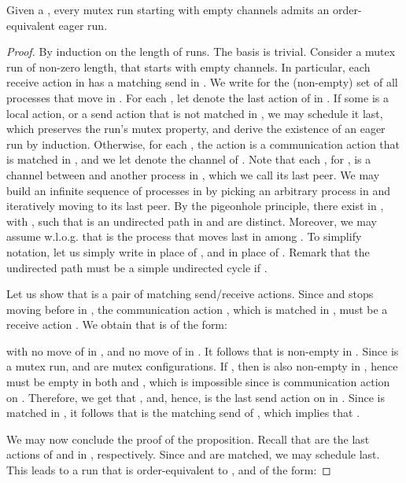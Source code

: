 \documentclass{LMCS}
\newenvironment{proposition}{\begin{prop}}{\end{prop}}
\begin{document}
\begin{proposition}
  \label{p:one-bound}
  Given a \qcp , every mutex run starting with empty channels
  admits an order-equivalent eager run.
\end{proposition}
\begin{proof}
  By induction on the length of runs.
  The basis is trivial.
  Consider a mutex run  of non-zero length, that starts with
  empty channels. In particular, each receive action in
   has a matching send in .
  We write  for the (non-empty) set of all processes
   that move in .
  For each , let  denote the last action of  in
  .
  If some  is a local action, or a send action that is not matched in
  , we may schedule it last, which preserves the run's mutex property,
  and derive the existence of an eager run  by induction.
  Otherwise, for each , the action  is a communication
  action that is matched in , and we let  denote the channel of
  .
  Note that each , for , is a channel between  and
  another process in , which we call its last peer.
  We may build an infinite sequence of processes in  by picking an
  arbitrary process in  and iteratively moving to its last peer.
  By the pigeonhole principle, there exist  in ,
  with , such that  is
  an undirected path in  and  are distinct.
  Moreover, we may assume w.l.o.g. that  is the process that moves
  last in  among .
  To simplify notation, let us simply write  in place of ,
  and  in place of .
Remark that the undirected path  must
  be a simple undirected cycle if .

  Let us show that  is a pair of matching send/receive actions.
  Since  and  stops moving before  in
  , the communication action , which is matched in ,
  must be a receive action .
  We obtain that  is of the form:
  
  with no move of  in , and no move of  in .
  It follows that  is non-empty in .
  Since  is a mutex run,  and  are mutex configurations.
  If , then  is also non-empty in , hence 
  must be empty in both  and , which is impossible since 
  is communication action on .
  Therefore, we get that , and, hence,  is the last send
  action on  in .
  Since  is matched in , it follows that  is the matching
  send of , which implies that .

  We may now conclude the proof of the proposition.
  Recall that  are the last actions of  and  in
  , respectively.
  Since  and  are matched,
  we may schedule  last.
  This leads to a run  that is order-equivalent to , and of
  the form:
  

\end{proof}
\end{document}
